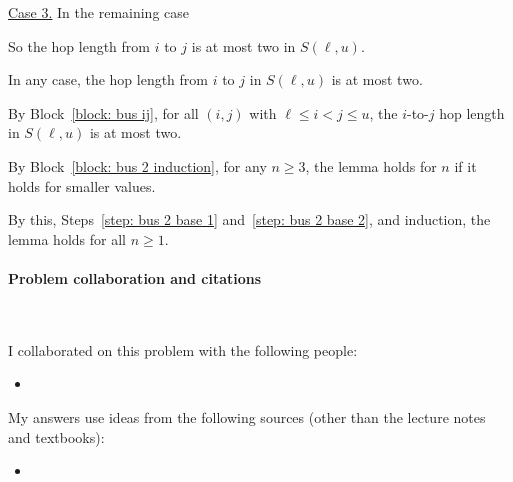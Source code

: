 \begin{longFormProof}
\begin{block}
\begin{block}
      \begin{block}
        \step \underline{Case 3.} In the remaining case \BLUE{
          \REPLACEME
        }

        \step \BLUE{
          \REPLACEME
        }
        \step So the hop length from $i$ to $j$ is at most two in $S(\ell, u)$. 
      \end{block}

      \step In any case, the hop length from $i$ to $j$ in $S(\ell, u)$ is at most two.

    \end{block}

    \smallskip
    
    \step By Block~\ref{block: bus ij}, for all $(i, j)$ with $\ell\le i < j \le u$,
    the $i$-to-$j$ hop length in $S(\ell, u)$ is at most two.

  \end{block}

  \step By Block~\ref{block: bus 2 induction}, for any $n\ge 3$, the lemma holds for $n$ if it holds for smaller values.

  \step By this, Steps~\ref{step: bus 2 base 1} and~\ref{step: bus 2 base 2},
  and induction, the lemma holds for all $n\ge 1$.
\end{longFormProof}


\continued 


\paragraph{Problem  collaboration and citations}~

I collaborated on this problem with the following people:
\begin{blue}
  \begin{itemize}
  \item \REPLACEME          %
  \end{itemize}
\end{blue}

My answers use ideas from the following sources (other than the lecture notes and textbooks): 
\begin{blue}
  \begin{itemize}
  \item \REPLACEME         %
  \end{itemize}
\end{blue}

